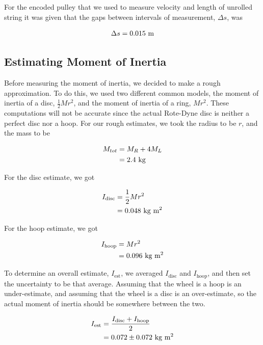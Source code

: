 \documentclass[coverpage]{article}
\newcommand{\iUnit}{\text{kg $\text{m}^2$}}
\begin{document}
	For the encoded pulley that we used to measure velocity and length of unrolled string it was given that the gaps between intervals of measurement, $\Delta{s}$, was
	
	\begin{align}
		\Delta{s}=0.015\ \text{m} \notag
	\end{align}

	\subsection{Estimating Moment of Inertia} \label{sect:estimating-moment-of-inertia}

	Before measuring the moment of inertia, we decided to make a rough approximation. To do this, we used two different common models, the moment of inertia of a disc, $\frac{1}{2}Mr^2$, and the moment of inertia of a ring, $Mr^2$. These computations will not be accurate since the actual Rote-Dyne disc is neither a perfect disc nor a hoop. For our rough estimates, we took the radius to be $r$, and the mass to be
	
	\begin{align}
		M_{tot}&=M_R + 4 M_L \notag \\
		&= 2.4\ \text{kg}
	\end{align}
	
	For the disc estimate, we got
	
	\begin{align}
		I_{\text{disc}}&=\frac{1}{2}Mr^2 \notag \\
		&= 0.048\ \iUnit
	\end{align}
	
	For the hoop estimate, we got
	
	\begin{align}
		I_{\text{hoop}}&= Mr^2 \notag \\
		&= 0.096\ \iUnit
	\end{align}

	To determine an overall estimate, $I_{\text{est}}$, we averaged $I_{\text{disc}}$ and $I_{\text{hoop}}$, and then set the uncertainty to be that average. Assuming that the wheel is a hoop is an under-estimate, and assuming that the wheel is a disc is an over-estimate, so the actual moment of inertia should be somewhere between the two.
	
	\begin{align}
		I_{\text{est}}&=\frac{I_{\text{disc}} + I_{\text{hoop}}}{2} \notag \\
		&= 0.072 \pm 0.072\ \iUnit \label{eq:def-i-est}
	\end{align}
\end{document}
